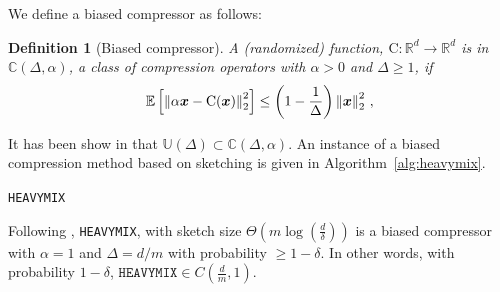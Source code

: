 \documentclass[twoside]{article}
\newtheorem{lemma}{Lemma}
\newtheorem{definition}{Definition}
\begin{document}
We define a biased compressor as follows:
\begin{definition}[Biased compressor]
A (randomized) function,  ${\text{C}}:\mathbb{R}^{d}\rightarrow\mathbb{R}^{d}$ is in $\mathbb{C}(\Delta,\alpha)$, a class of compression operators with $\alpha>0$ and $\Delta\geq 1$, if
\begin{align}\notag
    \mathbb{E}\left[\left\|\alpha\boldsymbol{x}-{\text{C}}(\boldsymbol{x})\right\|^2_2\right]\leq \left(1-\frac{1}{\Delta}\right)\left\|\boldsymbol{x}\right\|^2_2\, ,
\end{align}
\end{definition}
It has been show in \cite{horvath2020better} that $\mathbb{U}(\Delta)\subset\mathbb{C}(\Delta, \alpha)$.
An instance of a biased compression method based on sketching is given in Algorithm~\ref{alg:heavymix}.
\begin{algorithm}[H]
\caption{\texttt{HEAVYMIX}  }\label{alg:heavymix}
\begin{algorithmic}[1]
\end{algorithmic}
\end{algorithm}
Following \cite{ivkin2019communication}, \texttt{HEAVYMIX}, with sketch size $\Theta\left(m\log\left(\frac{d}{\delta}\right)\right)$ is a biased compressor with $\alpha=1$ and  $\Delta=d/m$ with probability $\geq1-\delta$. In other words, with probability $1-\delta$, $\texttt{HEAVYMIX}\in C(\frac{d}{m},1)$. 
\end{document}
